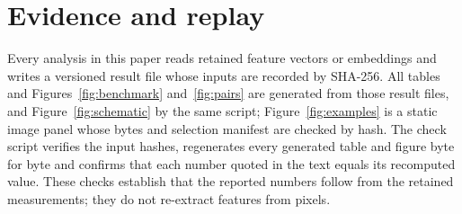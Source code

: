\FloatBarrier
\section{Evidence and replay}\label{app:replay}

Every analysis in this paper reads retained feature vectors or embeddings and writes a versioned
result file whose inputs are recorded by SHA-256. All tables and Figures~\ref{fig:benchmark}
and~\ref{fig:pairs} are generated from those result files, and Figure~\ref{fig:schematic} by the
same script; Figure~\ref{fig:examples} is a static image panel whose bytes and selection manifest are
checked by hash. The check script verifies the input hashes, regenerates every generated table and
figure byte for byte and confirms that each number quoted in the text equals its recomputed value. These checks establish that the reported numbers
follow from the retained measurements; they do not re-extract features from pixels.
